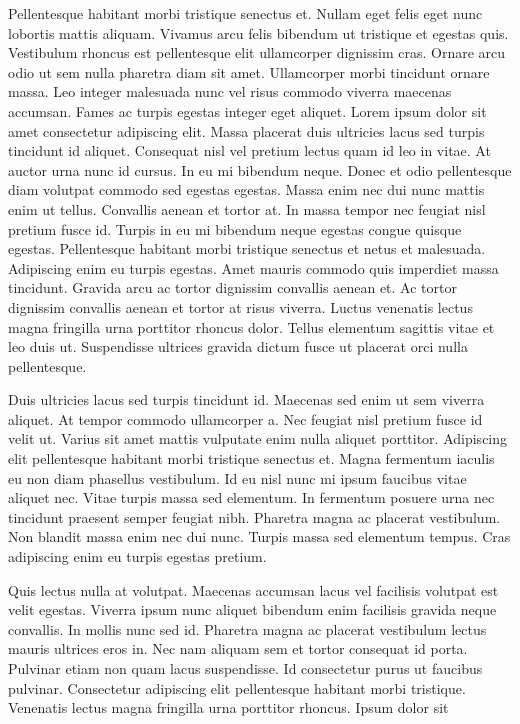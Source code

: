 \documentclass[12pt]{article}
\begin{document}
Pellentesque habitant morbi tristique senectus et. Nullam eget felis eget nunc lobortis mattis aliquam. Vivamus arcu felis bibendum ut tristique et egestas quis. Vestibulum rhoncus est pellentesque elit ullamcorper dignissim cras. Ornare arcu odio ut sem nulla pharetra diam sit amet. Ullamcorper morbi tincidunt ornare massa. Leo integer malesuada nunc vel risus commodo viverra maecenas accumsan.
Fames ac turpis egestas integer eget aliquet. Lorem ipsum dolor sit amet consectetur adipiscing elit. Massa placerat duis ultricies lacus sed turpis tincidunt id aliquet. Consequat nisl vel pretium lectus quam id leo in vitae. At auctor urna nunc id cursus. In eu mi bibendum neque. Donec et odio pellentesque diam volutpat commodo sed egestas egestas. Massa enim nec dui nunc mattis enim ut tellus. Convallis aenean et tortor at. In massa tempor nec feugiat nisl pretium fusce id. Turpis in eu mi bibendum neque egestas congue quisque egestas. Pellentesque habitant morbi tristique senectus et netus et malesuada. Adipiscing enim eu turpis egestas. Amet mauris commodo quis imperdiet massa tincidunt. Gravida arcu ac tortor dignissim convallis aenean et. Ac tortor dignissim convallis aenean et tortor at risus viverra. Luctus venenatis lectus magna fringilla urna porttitor rhoncus dolor. Tellus elementum sagittis vitae et leo duis ut. Suspendisse ultrices gravida dictum fusce ut placerat orci nulla pellentesque.

Duis ultricies lacus sed turpis tincidunt id. Maecenas sed enim ut sem viverra aliquet. At tempor commodo ullamcorper a. Nec feugiat nisl pretium fusce id velit ut. Varius sit amet mattis vulputate enim nulla aliquet porttitor. Adipiscing elit pellentesque habitant morbi tristique senectus et. Magna fermentum iaculis eu non diam phasellus vestibulum. Id eu nisl nunc mi ipsum faucibus vitae aliquet nec. Vitae turpis massa sed elementum. In fermentum posuere urna nec tincidunt praesent semper feugiat nibh. Pharetra magna ac placerat vestibulum. Non blandit massa enim nec dui nunc. Turpis massa sed elementum tempus. Cras adipiscing enim eu turpis egestas pretium.

Quis lectus nulla at volutpat. Maecenas accumsan lacus vel facilisis volutpat est velit egestas. Viverra ipsum nunc aliquet bibendum enim facilisis gravida neque convallis. In mollis nunc sed id. Pharetra magna ac placerat vestibulum lectus mauris ultrices eros in. Nec nam aliquam sem et tortor consequat id porta. Pulvinar etiam non quam lacus suspendisse. Id consectetur purus ut faucibus pulvinar. Consectetur adipiscing elit pellentesque habitant morbi tristique. Venenatis lectus magna fringilla urna porttitor rhoncus. Ipsum dolor sit
\end{document}
